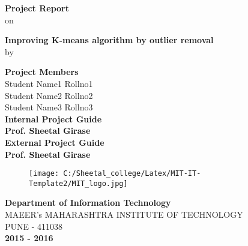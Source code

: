 \vspace{0.4in}
\begin{center}
{\bf Project Report} \\
{on}
\end {center} 
\begin{center}
{\Large \bf Improving K-means algorithm by outlier removal} \\
{by}
\vspace{0.2in}

{\bf Project Members} \\ 
\vspace{0.2in}
{ Student Name1 Rollno1}\\
{ Student Name2 Rollno2}\\ 
{ Student Name3 Rollno3}\\ 
\vspace{0.4in}
{\bf Internal Project Guide}\\
\vspace{0.1in}
{\large {\bf Prof. Sheetal Girase}}\\
\vspace{0.3in}
{\bf External Project Guide}\\
\vspace{0.1in}
{\large {\bf Prof. Sheetal Girase}}\\
\vspace{0.5in}
\begin{figure}[h]
	\centering
		\texttt{[image: C:/Sheetal\_college/Latex/MIT-IT-Template2/MIT\_logo.jpg]}
	\label{fig:mit}
\end{figure}

{\bf Department of Information Technology} \\
{\large MAEER's MAHARASHTRA INSTITUTE OF TECHNOLOGY\\
{PUNE - 411038}\\
{\bf 2015 - 2016}}
\end{center}
